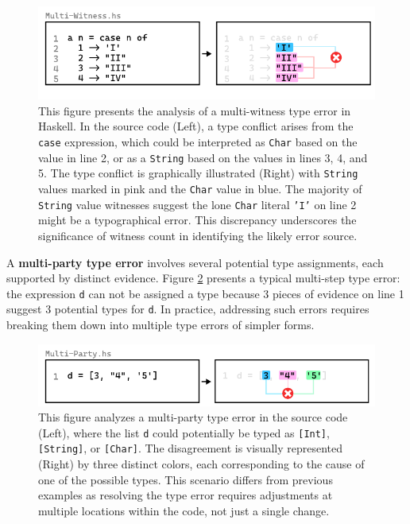 \begin{figure}[htbp]
\centering  \includegraphics[width=\linewidth]{Multi-Witness}
  \caption[This illustration depicts a multi-witness type error in Haskell]{
    \label{fig:multi-witness-example}
    This figure presents the analysis of a multi-witness type error in Haskell. In the source code (Left), a type conflict arises from the \texttt{case} expression, which could be interpreted as \texttt{Char} based on the value in line 2, or as a \texttt{String} based on the values in lines 3, 4, and 5. The type conflict is graphically illustrated (Right) with \texttt{String} values marked in pink and the \texttt{Char} value in blue. The majority of \texttt{String} value witnesses suggest the lone \texttt{Char} literal \texttt{'I'} on line 2 might be a typographical error. This discrepancy underscores the significance of witness count in identifying the likely error source.}
\end{figure}

A \textbf{multi-party type error} involves several potential type assignments, each supported by distinct evidence.  Figure \ref{fig:multi-party-example} presents a typical multi-step type error: the expression \texttt{d} can not be assigned a type because 3 pieces of evidence on line 1 suggest 3 potential types for \texttt{d}. In practice, addressing such errors requires breaking them down into multiple type errors of simpler forms.


\begin{figure}[htbp]
\centering  \includegraphics[width=\linewidth]{Multi-Party}
  \caption[This illustration depicts a multi-party type error in Haskell]{
    \label{fig:multi-party-example}
    This figure analyzes a multi-party type error in the source code (Left), where the list \texttt{d} could potentially be typed as \texttt{[Int]}, \texttt{[String]}, or \texttt{[Char]}. The disagreement is visually represented (Right) by three distinct colors, each corresponding to the cause of one of the possible types. This scenario differs from previous examples as resolving the type error requires adjustments at multiple locations within the code, not just a single change.
       }
\end{figure}




